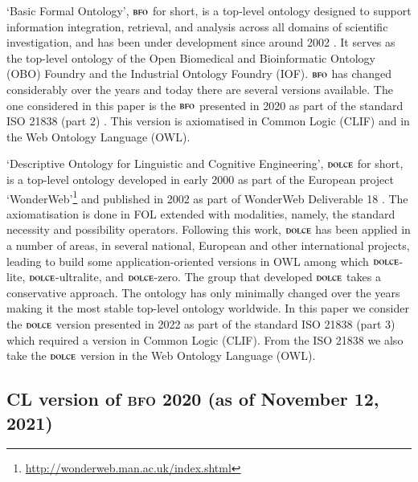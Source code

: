 \documentclass[ao]{iosart2x}
\newcommand{\dolce}{{\textsc{dolce}}}
\newcommand{\bfo}{{\textsc{bfo}}}
\begin{document}
`Basic Formal Ontology', $\bfo$ for short, is a top-level ontology designed to support information integration, retrieval, and analysis across all domains of scientific investigation, and has been under development since around 2002  \citep{grenonBiodynamic2004}.
It serves as the top-level ontology of the Open Biomedical and Bioinformatic Ontology (OBO) Foundry and the Industrial Ontology Foundry (IOF). $\bfo$ has changed considerably over the years and today there are several versions available.
The one considered in this paper is the $\bfo$ presented in 2020 as part of the standard ISO 21838 (part 2) \cite{ISO21838}. This version is axiomatised in Common Logic (CLIF) \cite{ISO24707} and in the Web Ontology Language (OWL).

\medskip
`Descriptive Ontology for Linguistic and Cognitive Engineering', $\dolce$ for short, is a top-level ontology developed in early 2000 as part of the European project `WonderWeb'\footnote{\url{http://wonderweb.man.ac.uk/index.shtml}} and published in 2002 as part of WonderWeb Deliverable 18 \citet{D18}. The axiomatisation is done in FOL extended with modalities, namely, the standard necessity and possibility operators. Following this work, $\dolce$ has been applied in a number of areas, in several national, European and other international projects, leading to build some application-oriented versions in OWL among which $\dolce$-lite, $\dolce$-ultralite, and $\dolce$-zero. 
The group that developed $\dolce$ takes a conservative approach. The ontology has only minimally changed over the years making it the most stable top-level ontology worldwide. In this paper we consider the $\dolce$ version presented in 2022 as part of the standard ISO 21838 (part 3) which required a version in Common Logic (CLIF). 
From the ISO 21838 we also take the $\dolce$ version in the Web Ontology Language (OWL).

\subsection{CL version of {\bfo} 2020 (as of November 12, 2021)}\label{sect_bfo}

%
\end{document}
